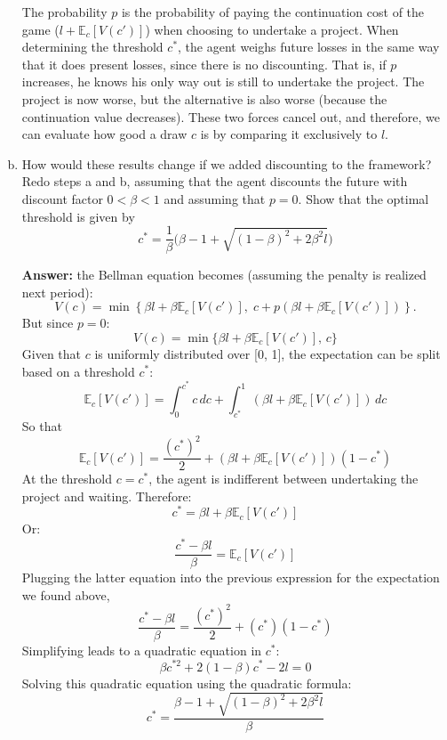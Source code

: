 \documentclass[11pt]{extarticle}
\theoremstyle{plain}
\theoremstyle{definition}
\begin{document}
\begin{enumerate}[(a)]
The probability \( p \) is the probability of paying the continuation cost of the game ($l + \mathbb{E}_c \left[ V(c') \right]$) when choosing to undertake a project. When determining the threshold \( c^* \), the agent weighs future losses in the same way that it does present losses, since there is no discounting. That is, if $p$ increases, he knows his only way out is still to undertake the project. The project is now worse, but the alternative is also worse (because the continuation value decreases). These two forces cancel out, and therefore, we can evaluate how good a draw $c$ is by comparing it exclusively to $l$. 

\item How would these results change if we added discounting to the framework? Redo steps a and b, assuming that the agent discounts the future with discount factor $0 < \beta < 1$ and assuming that $p = 0$. Show that the optimal threshold is given by
\begin{equation*}
	c^* = \frac{1}{\beta} \bigg( \beta - 1 + \sqrt{ (1-\beta)^2 + 2 \beta^2 l } \bigg)
\end{equation*}

\textbf{Answer:} the Bellman equation becomes (assuming the penalty is realized next period):
\[
V(c) = \min \left\{ \beta l + \beta \mathbb{E}_c \left[ V(c') \right], \; c + p (\beta l+\beta\mathbb{E}_c \left[ V(c') \right])  \right\}.
\]
But since $p=0$:
\[
V(c) = \min \{\beta l + \beta  \mathbb{E}_c \left[ V(c') \right], \, c \}
\]
Given that \( c \) is uniformly distributed over [0, 1], the expectation can be split based on a threshold \( c^* \):
\[
\mathbb{E}_c \left[ V(c') \right] = \int_{0}^{c^*} c \, dc + \int_{c^*}^{1} (\beta l + \beta \mathbb{E}_c \left[ V(c') \right]) \, dc
\]
So that \[
\mathbb{E}_c \left[ V(c') \right] = \frac{(c^*)^2}{2} + (\beta l + \beta \mathbb{E}_c \left[ V(c') \right])(1 - c^*)
\]
At the threshold \( c = c^* \), the agent is indifferent between undertaking the project and waiting. Therefore:
\[
c^* = \beta l + \beta \mathbb{E}_c \left[ V(c') \right]
\]
Or: 
\[
\frac{c^*-\beta l}{\beta} =  \mathbb{E}_c \left[ V(c') \right]
\]
Plugging the latter equation into the previous expression for the expectation we found above, \[
\frac{c^*-\beta l}{\beta} = \frac{(c^*)^2}{2} + (c^*)(1 - c^*)
\]
Simplifying leads to a quadratic equation in \( c^* \):
\[
\beta c^{*2} + 2(1 - \beta)c^* - 2l = 0
\]
Solving this quadratic equation using the quadratic formula:
\[
c^* = \frac{ \beta - 1 + \sqrt{(1 - \beta)^2 + 2\beta ^ 2 l} }{ \beta }
\]



\end{enumerate}
\end{document}
